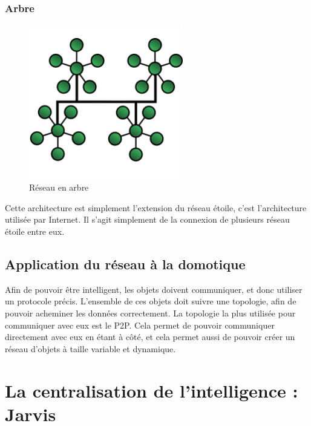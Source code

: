 	    \subsubsection{Arbre}
\begin{figure}[!ht]
         \centering
         \includegraphics[width=0.6\textwidth]{img/TreeTopology.png}
         \caption{Réseau en arbre}
         \label{TreeNetwork}
\end{figure}
Cette architecture est simplement l'extension du réseau étoile, c'est l'architecture utilisée par Internet. Il s'agit simplement de la connexion de plusieurs réseau étoile entre eux.
	\subsection{Application du réseau à la domotique}
Afin de pouvoir être intelligent, les objets doivent communiquer, et donc utiliser un protocole précis. 
L'ensemble de ces objets doit suivre une topologie, afin de pouvoir acheminer les données correctement. La topologie la plus utilisée pour communiquer avec eux est le P2P. Cela permet de pouvoir communiquer directement avec eux en étant à côté, et cela permet aussi de pouvoir créer un réseau d'objets à taille variable et dynamique.


\section{La centralisation de l’intelligence : Jarvis}
